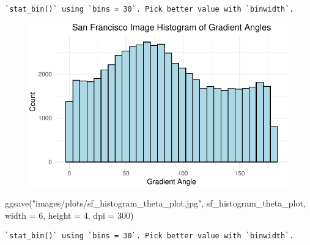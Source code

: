 \documentclass[
  letterpaper,
  DIV=11,
  numbers=noendperiod]{scrreprt}
\newenvironment{Shaded}{\begin{snugshade}}{\end{snugshade}}
\newcommand{\AttributeTok}[1]{\textcolor[rgb]{0.40,0.45,0.13}{#1}}
\newcommand{\DecValTok}[1]{\textcolor[rgb]{0.68,0.00,0.00}{#1}}
\newcommand{\FunctionTok}[1]{\textcolor[rgb]{0.28,0.35,0.67}{#1}}
\newcommand{\NormalTok}[1]{\textcolor[rgb]{0.00,0.23,0.31}{#1}}
\newcommand{\StringTok}[1]{\textcolor[rgb]{0.13,0.47,0.30}{#1}}
\begin{document}
\begin{verbatim}
`stat_bin()` using `bins = 30`. Pick better value with `binwidth`.
\end{verbatim}

\begin{figure}[H]

{\centering \includegraphics{results_files/figure-pdf/unnamed-chunk-10-2.pdf}

}

\end{figure}

\begin{Shaded}
\begin{Highlighting}[]
\FunctionTok{ggsave}\NormalTok{(}\StringTok{"images/plots/sf\_histogram\_theta\_plot.jpg"}\NormalTok{, sf\_histogram\_theta\_plot, }\AttributeTok{width =} \DecValTok{6}\NormalTok{, }\AttributeTok{height =} \DecValTok{4}\NormalTok{, }\AttributeTok{dpi =} \DecValTok{300}\NormalTok{)}
\end{Highlighting}
\end{Shaded}

\begin{verbatim}
`stat_bin()` using `bins = 30`. Pick better value with `binwidth`.
\end{verbatim}
\end{document}
